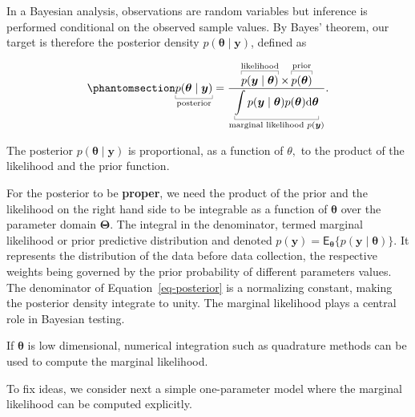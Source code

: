 \documentclass[
  11pt,
  letterpaper,
]{scrbook}
\theoremstyle{definition}
\theoremstyle{definition}
\theoremstyle{definition}
\theoremstyle{plain}
\theoremstyle{plain}
\theoremstyle{remark}
\begin{document}
In a Bayesian analysis, observations are random variables but inference
is performed conditional on the observed sample values. By Bayes'
theorem, our target is therefore the posterior density
\(p(\boldsymbol{\theta} \mid \boldsymbol{y})\), defined as

\begin{equation}\phantomsection\label{eq-posterior}{
\underbracket[0.25pt]{p(\boldsymbol{\theta} \mid \boldsymbol{y})}_{\text{posterior}} = \frac{\overbracket[0.25pt]{p(\boldsymbol{y} \mid \boldsymbol{\theta})}^{\text{likelihood}} \times  \overbracket[0.25pt]{p(\boldsymbol{\theta})}^{\text{prior}}}{\underbracket[0.25pt]{\int p(\boldsymbol{y} \mid \boldsymbol{\theta}) p(\boldsymbol{\theta}) \mathrm{d} \boldsymbol{\theta}}_{\text{marginal likelihood }p(\boldsymbol{y})}}.
}\end{equation}

The posterior \(p(\boldsymbol{\theta} \mid \boldsymbol{y})\) is
proportional, as a function of \(\theta,\) to the product of the
likelihood and the prior function.

For the posterior to be \textbf{proper}, we need the product of the
prior and the likelihood on the right hand side to be integrable as a
function of \(\boldsymbol{\theta}\) over the parameter domain
\(\boldsymbol{\Theta}\). The integral in the denominator, termed
marginal likelihood or prior predictive distribution and denoted
\(p(\boldsymbol{y}) = \mathsf{E}_{\boldsymbol{\theta}}\{p(\boldsymbol{y} \mid \boldsymbol{\theta})\}\).
It represents the distribution of the data before data collection, the
respective weights being governed by the prior probability of different
parameters values. The denominator of Equation~\ref{eq-posterior} is a
normalizing constant, making the posterior density integrate to unity.
The marginal likelihood plays a central role in Bayesian testing.

If \(\boldsymbol{\theta}\) is low dimensional, numerical integration
such as quadrature methods can be used to compute the marginal
likelihood.

To fix ideas, we consider next a simple one-parameter model where the
marginal likelihood can be computed explicitly.
\end{document}
